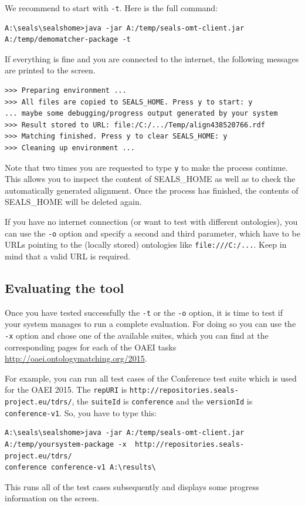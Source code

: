 \documentclass{article}
\def\file#1{\textcolor{grayy}{\texttt{#1}}}
\begin{document}
We recommend to start with \verb|-t|. Here is the full command:
\begin{verbatim}
A:\seals\sealshome>java -jar A:/temp/seals-omt-client.jar
A:/temp/demomatcher-package -t
\end{verbatim}
If everything is fine and you are connected to the internet, the following messages are printed to the screen.
\begin{verbatim}
>>> Preparing environment ...
>>> All files are copied to SEALS_HOME. Press y to start: y
... maybe some debugging/progress output generated by your system
>>> Result stored to URL: file:/C:/.../Temp/align438520766.rdf
>>> Matching finished. Press y to clear SEALS_HOME: y
>>> Cleaning up environment ...
\end{verbatim}
Note that two times you are requested to type \verb|y| to make the process continue. This allows you to inspect the content of SEALS\_HOME as well as to check the automatically generated alignment. Once the process has finished, the contents of SEALS\_HOME will be deleted again.

If you have no internet connection (or want to test with different ontologies), you can use the \verb|-o| option and specify a second and third parameter, which have to be URLs pointing to the (locally stored) ontologies like \file{file:///C:/...}.  Keep in mind that a valid URL is required.

\subsection{Evaluating the tool}
\label{sub:test-eval}

Once you have tested successfully the \verb|-t| or the \verb|-o| option, it is time to test if your system manages to run a complete evaluation. 
For doing so you can use the \verb|-x| option and chose one of the available suites, which you can find at the corresponding pages for each of the OAEI tasks
\url{http://oaei.ontologymatching.org/2015}.

For example, you can run all test cases of the Conference test suite which is used for the OAEI 2015. 
The \verb|repURI| is \verb|http://repositories.seals-project.eu/tdrs/|, the \verb|suiteId| is \verb|conference| and the \verb|versionId| is \verb|conference-v1|. So, you have to type this:
\begin{verbatim}
A:\seals\sealshome>java -jar A:/temp/seals-omt-client.jar 
A:/temp/yoursystem-package -x  http://repositories.seals-project.eu/tdrs/
conference conference-v1 A:\results\
\end{verbatim}
This runs all of the test cases subsequently and displays some progress information on the screen.
\end{document}
